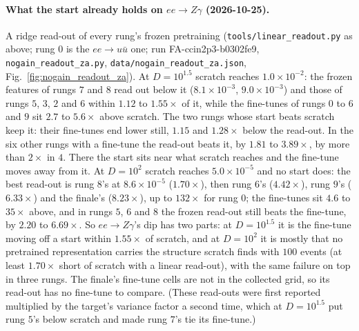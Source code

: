 \documentclass[11pt]{article}
\newcommand{\code}[1]{\texttt{#1}}
\begin{document}
\paragraph{What the start already holds on $ee\to Z\gamma$ (2026-10-25).} A ridge read-out of every rung's frozen
pretraining (\code{tools/linear\_readout.py} as above; rung $0$ is the $ee\to u\bar u$ one; run FA-ccin2p3-b0302fe9,
\code{nogain\_readout\_za.py}, \code{data/nogain\_readout\_za.json}, Fig.~\ref{fig:nogain_readout_za}). At $D=10^{1.5}$ scratch reaches
$1.0\times10^{-2}$: the frozen features of rungs $7$ and $8$ read out below it ($8.1\times10^{-3}$, $9.0\times10^{-3}$)
and those of rungs $5$, $3$, $2$ and $6$ within $1.12$ to $1.55\times$ of it, while the fine-tunes of rungs $0$ to $6$
and $9$ sit $2.7$ to $5.6\times$ above scratch. The two rungs whose start beats scratch keep it: their fine-tunes end
lower still, $1.15$ and $1.28\times$ below the read-out. In the six other rungs
with a fine-tune the read-out beats it, by $1.81$ to $3.89\times$, by more than $2\times$ in $4$. There the start sits
near what scratch reaches and the fine-tune moves away from it. At $D=10^2$ scratch reaches
$5.0\times10^{-5}$ and no start does: the best read-out is rung $8$'s at $8.6\times10^{-5}$ ($1.70\times$), then rung $6$'s
($4.42\times$), rung $9$'s ($6.33\times$) and the finale's ($8.23\times$), up to $132\times$ for rung $0$; the fine-tunes sit
$4.6$ to $35\times$ above, and in rungs $5$, $6$ and $8$ the frozen read-out still beats the fine-tune, by $2.20$ to
$6.69\times$. So $ee\to Z\gamma$'s dip has two parts: at $D=10^{1.5}$ it is the fine-tune moving off a start within
$1.55\times$ of scratch, and at $D=10^2$ it is mostly that no pretrained representation carries the structure scratch finds
with $100$ events (at least $1.70\times$ short of scratch with a linear read-out), with the same failure on top in three
rungs. The finale's fine-tune cells are not in the collected grid, so its read-out has no fine-tune to compare.
(These read-outs were first reported multiplied by the target's variance factor a second time, which at
$D=10^{1.5}$ put rung $5$'s below scratch and made rung $7$'s tie its fine-tune.)
\end{document}
